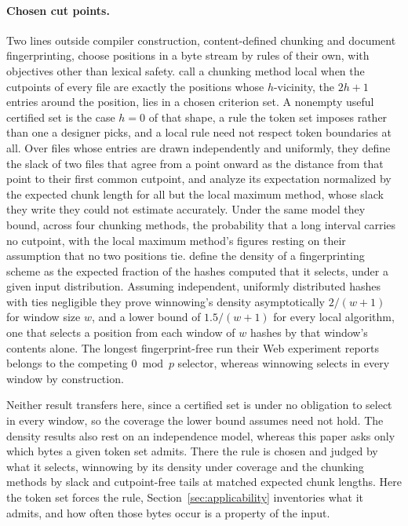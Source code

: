\documentclass[11pt,a4paper]{article}
\theoremstyle{definition}
\theoremstyle{plain}
\begin{document}
\paragraph{Chosen cut points.} Two lines outside compiler construction, content-defined chunking and document
fingerprinting, choose positions in a byte stream by rules of their own, with objectives other than lexical safety.
\citet{bjorner2010chunking} call a chunking method local when the cutpoints of every file are exactly the positions
whose $h$-vicinity, the $2h + 1$ entries around the position, lies in a chosen criterion set. A nonempty useful
certified set is the case $h = 0$ of that shape, a rule the token set imposes rather than one a designer picks, and a
local rule need not respect token boundaries at all. Over files whose entries are drawn independently and uniformly,
they define the slack of two files that agree from a point onward as the distance from that point to their first common
cutpoint, and analyze its expectation normalized by the expected chunk length for all but the local maximum method,
whose slack they write they could not estimate accurately. Under the same model they bound, across four chunking
methods, the probability that a long interval carries no cutpoint, with the local maximum method's figures resting on
their assumption that no two positions tie. \citet{schleimer2003winnowing} define the density of a fingerprinting scheme
as the expected fraction of the hashes computed that it selects, under a given input distribution. Assuming independent,
uniformly distributed hashes with ties negligible they prove winnowing's density asymptotically $2/(w+1)$ for window
size $w$, and a lower bound of $1.5/(w+1)$ for every local algorithm, one that selects a position from each window of
$w$ hashes by that window's contents alone. The longest fingerprint-free run their Web experiment reports belongs to the
competing $0 \bmod p$ selector, whereas winnowing selects in every window by construction.

Neither result transfers here, since a certified set is under no obligation to select in every window, so the coverage
the lower bound assumes need not hold. The density results also rest on an independence model, whereas this paper asks
only which bytes a given token set admits. There the rule is chosen and judged by what it selects, winnowing by its
density under coverage and the chunking methods by slack and cutpoint-free tails at matched expected chunk lengths. Here
the token set forces the rule, Section~\ref{sec:applicability} inventories what it admits, and how often those bytes
occur is a property of the input.
\end{document}
